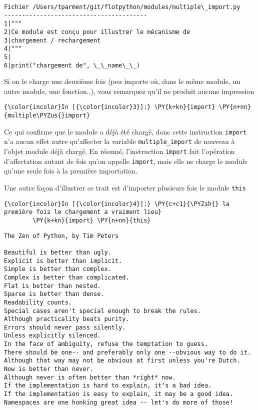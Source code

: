     \begin{Verbatim}[commandchars=\\\{\}]
Fichier /Users/tparment/git/flotpython/modules/multiple\_import.py
----------------------------------------
1|"""
2|Ce module est conçu pour illustrer le mécanisme de
3|chargement / rechargement 
4|"""
5|
6|print("chargement de", \_\_name\_\_)

    \end{Verbatim}

    Si on le charge une deuxième fois (peu importe où, dans le même module,
un autre module, une fonction..), vous remarquez qu'il ne produit aucune
impression

    \begin{Verbatim}[commandchars=\\\{\}]
{\color{incolor}In [{\color{incolor}3}]:} \PY{k+kn}{import} \PY{n+nn}{multiple\PYZus{}import} 
\end{Verbatim}


    Ce qui confirme que le module a déjà été chargé, donc cette instruction
\texttt{import} n'a aucun effet autre qu'affecter la variable
\texttt{multiple\_import} de nouveau à l'objet module déjà chargé. En
résumé, l'instruction \texttt{import} fait l'opération d'affectation
autant de fois qu'on appelle \texttt{import}, mais elle ne charge le
module qu'une seule fois à la première importation.

    Une autre façon d'illustrer ce trait est d'importer plusieurs fois le
module \texttt{this}

    \begin{Verbatim}[commandchars=\\\{\}]
{\color{incolor}In [{\color{incolor}4}]:} \PY{c+c1}{\PYZsh{} la première fois le chargement a vraiment lieu}
        \PY{k+kn}{import} \PY{n+nn}{this}
\end{Verbatim}


    \begin{Verbatim}[commandchars=\\\{\}]
The Zen of Python, by Tim Peters

Beautiful is better than ugly.
Explicit is better than implicit.
Simple is better than complex.
Complex is better than complicated.
Flat is better than nested.
Sparse is better than dense.
Readability counts.
Special cases aren't special enough to break the rules.
Although practicality beats purity.
Errors should never pass silently.
Unless explicitly silenced.
In the face of ambiguity, refuse the temptation to guess.
There should be one-- and preferably only one --obvious way to do it.
Although that way may not be obvious at first unless you're Dutch.
Now is better than never.
Although never is often better than *right* now.
If the implementation is hard to explain, it's a bad idea.
If the implementation is easy to explain, it may be a good idea.
Namespaces are one honking great idea -- let's do more of those!

    \end{Verbatim}

